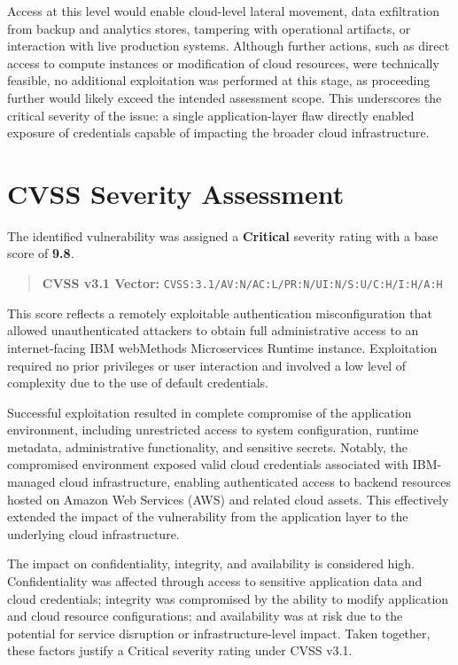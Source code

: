 \documentclass[12pt,a4paper]{report}
\begin{document}
\noindent
Access at this level would enable cloud-level lateral movement, data exfiltration from backup and analytics stores, tampering with operational artifacts, or interaction with live production systems. Although further actions, such as direct access to compute instances or modification of cloud resources, were technically feasible, no additional exploitation was performed at this stage, as proceeding further would likely exceed the intended assessment scope. This underscores the critical severity of the issue: a single application-layer flaw directly enabled exposure of credentials capable of impacting the broader cloud infrastructure.
\clearpage
\section{CVSS Severity Assessment}

The identified vulnerability was assigned a \textbf{Critical} severity rating with a base score of \textbf{9.8}.

\begin{quote}
	\textbf{CVSS v3.1 Vector:} \texttt{CVSS:3.1/AV:N/AC:L/PR:N/UI:N/S:U/C:H/I:H/A:H}
\end{quote}

This score reflects a remotely exploitable authentication misconfiguration that allowed unauthenticated attackers to obtain full administrative access to an internet-facing IBM webMethods Microservices Runtime instance. Exploitation required no prior privileges or user interaction and involved a low level of complexity due to the use of default credentials.

Successful exploitation resulted in complete compromise of the application environment, including unrestricted access to system configuration, runtime metadata, administrative functionality, and sensitive secrets. Notably, the compromised environment exposed valid cloud credentials associated with IBM-managed cloud infrastructure, enabling authenticated access to backend resources hosted on Amazon Web Services (AWS) and related cloud assets. This effectively extended the impact of the vulnerability from the application layer to the underlying cloud infrastructure.

The impact on confidentiality, integrity, and availability is considered high. Confidentiality was affected through access to sensitive application data and cloud credentials; integrity was compromised by the ability to modify application and cloud resource configurations; and availability was at risk due to the potential for service disruption or infrastructure-level impact. Taken together, these factors justify a Critical severity rating under CVSS v3.1.
\clearpage
\end{document}
